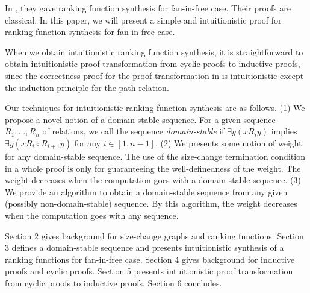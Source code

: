 In \cite{Benamram09,Benamram10},
they gave ranking function synthesis for fan-in-free case.
Their proofs are classical.
In this paper, we will present a simple and intuitionistic proof
for ranking function synthesis for fan-in-free case.

When we obtain intuitionistic ranking function synthesis,
it is straightforward to obtain intuitionistic proof transformation
from cyclic proofs to inductive proofs, since
the correctness proof for the proof transformation in \cite{Berardi17a,Berardi18} is intuitionistic except 
the induction principle for the path relation.

Our techniques for intuitionistic ranking function synthesis are as follows.
(1) We propose a novel notion of a domain-stable sequence.
For a given sequence $R_1,\ldots,R_n$ of relations,
we call the sequence {\em domain-stable} if
$\exists y(x R_i y)$ implies
$\exists y(x R_i \circ R_{i+1} y)$ for any $i \in [1,n-1]$.
(2) We presents some notion of weight for any domain-stable sequence.
The use of the size-change termination condition in a whole proof is only for 
guaranteeing the well-definedness of the weight.
The weight decreases when the computation goes with a domain-stable sequence.
(3) We provide an algorithm to obtain a domain-stable sequence from
any given (possibly non-domain-stable) sequence. 
By this algorithm,
the weight decreases when the computation goes with any sequence.

Section 2 gives background for size-change graphs and ranking functions.
Section 3 defines a domain-stable sequence and
presents intuitionistic synthesis of a ranking functions
for fan-in-free case.
Section 4 gives background for inductive proofs and cyclic proofs.
Section 5 presents intuitionistic proof transformation from
cyclic proofs to inductive proofs.
Section 6 concludes.